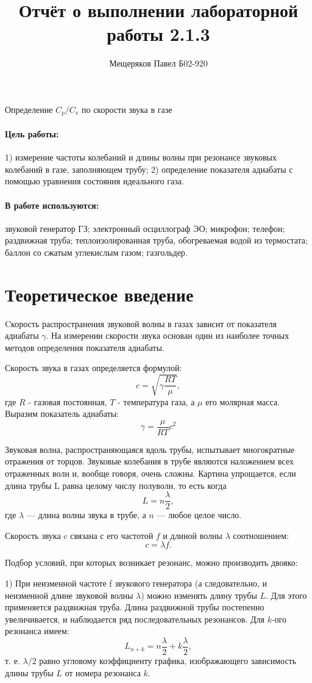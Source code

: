 \documentclass[a4paper,12pt]{article}
\author{Мещеряков Павел Б02-920}
\title{Отчёт о выполнении лабораторной работы 2.1.3}
\begin{document}
	\maketitle
	\begin{center}
		{\Large Определение $C_p/C_v$ по скорости звука в газе}
	\end{center}
	\paragraph*{Цель работы:} 1) измерение частоты
	колебаний
	и длины волны при
	резонансе звуковых
	колебаний в газе, заполняющем трубу; 2) определение показателя адиабаты с помощью уравнения состояния идеального газа.
	\paragraph*{В работе используются:} звуковой генератор ГЗ; электронный
	осциллограф ЭО; микрофон; телефон; раздвижная труба; теплоизолированная труба, обогреваемая водой из термостата; баллон
	со сжатым углекислым газом; газгольдер.
	\section{Теоретическое введение}
	
		Cкорость распространения звуковой волны в газах зависит от показателя адиабаты $\gamma$. На измерении скорости звука основан один из наиболее  точных методов определения показателя  адиабаты.
		
		Скорость звука в газах определяется формулой:
		$$c=\sqrt{\gamma\frac{RT}{\mu}},$$
		где $R$ - газовая постоянная, $T$ - температура газа, а $\mu$ его молярная масса. Выразим показатель адиабаты:
		$$\gamma=\frac{\mu}{RT} c^2$$
		
		Звуковая волна, распространяющаяся вдоль трубы, испытывает многократные отражения от торцов. Звуковые колебания в трубе являются наложением всех отраженных волн и, вообще говоря, очень сложны. Картина упрощается, если длина трубы L равна целому числу полуволн, то есть когда
		$$L=n\frac{\lambda}{2},$$
		где $\lambda$ — длина волны звука в трубе, а $n$ — любое целое число.
		
		Скорость звука c связана с его частотой $f$ и длиной волны $\lambda$ соотношением:
		$$c=\lambda f.$$
		
		Подбор условий, при которых возникает резонанс, можно производить двояко:
		
		1) При неизменной частоте f звукового генератора (а следовательно, и неизменной длине звуковой волны $\lambda$) можно изменять длину трубы $L$. Для этого применяется раздвижная труба. Длина раздвижной трубы постепенно увеличивается, и наблюдается ряд последовательных резонансов. Для $k$-ого резонанса имеем:
		$$L_{n+k}=n\frac{\lambda}{2} + k\frac{\lambda}{2},$$
		т. е. $\lambda/2$ равно угловому коэффициенту графика, изображающего зависимость длины трубы $L$ от номера резонанса $k$.
		
\end{document}
